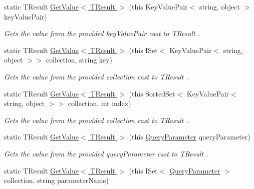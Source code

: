 \begin{DoxyCompactItemize}
\item 
static T\+Result \hyperlink{classCqrs_1_1Repositories_1_1Queries_1_1QueryPredicateExtensions_aa76dc536f915299de4743ac9b801433d_aa76dc536f915299de4743ac9b801433d}{Get\+Value$<$ T\+Result $>$} (this Key\+Value\+Pair$<$ string, object $>$ key\+Value\+Pair)
\begin{DoxyCompactList}\small\item\em Gets the value from the provided {\itshape key\+Value\+Pair}  cast to {\itshape T\+Result} . \end{DoxyCompactList}\item 
static T\+Result \hyperlink{classCqrs_1_1Repositories_1_1Queries_1_1QueryPredicateExtensions_ae7ce4440706b552213ec680ac3391b7a_ae7ce4440706b552213ec680ac3391b7a}{Get\+Value$<$ T\+Result $>$} (this I\+Set$<$ Key\+Value\+Pair$<$ string, object $>$$>$ collection, string key)
\begin{DoxyCompactList}\small\item\em Gets the value from the provided {\itshape collection}  cast to {\itshape T\+Result} . \end{DoxyCompactList}\item 
static T\+Result \hyperlink{classCqrs_1_1Repositories_1_1Queries_1_1QueryPredicateExtensions_a54d17009ea7aa13b5ca6b4f653d06d82_a54d17009ea7aa13b5ca6b4f653d06d82}{Get\+Value$<$ T\+Result $>$} (this Sorted\+Set$<$ Key\+Value\+Pair$<$ string, object $>$$>$ collection, int index)
\begin{DoxyCompactList}\small\item\em Gets the value from the provided {\itshape collection}  cast to {\itshape T\+Result} . \end{DoxyCompactList}\item 
static T\+Result \hyperlink{classCqrs_1_1Repositories_1_1Queries_1_1QueryPredicateExtensions_a185f34dfbcf58429fc407b594c55f511_a185f34dfbcf58429fc407b594c55f511}{Get\+Value$<$ T\+Result $>$} (this \hyperlink{classCqrs_1_1Repositories_1_1Queries_1_1QueryParameter}{Query\+Parameter} query\+Parameter)
\begin{DoxyCompactList}\small\item\em Gets the value from the provided {\itshape query\+Parameter}  cast to {\itshape T\+Result} . \end{DoxyCompactList}\item 
static T\+Result \hyperlink{classCqrs_1_1Repositories_1_1Queries_1_1QueryPredicateExtensions_a64fd0cc36edc56c037cd876034d92ebc_a64fd0cc36edc56c037cd876034d92ebc}{Get\+Value$<$ T\+Result $>$} (this I\+Set$<$ \hyperlink{classCqrs_1_1Repositories_1_1Queries_1_1QueryParameter}{Query\+Parameter} $>$ collection, string parameter\+Name)

\end{DoxyCompactItemize}
